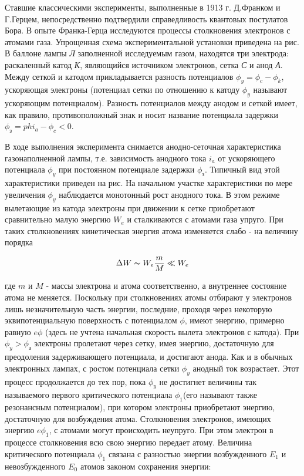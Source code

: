 Ставшие классическими эксперименты, выполненные в 1913 г. Д.Франком и Г.Герцем, непосредственно подтвердили справедливость квантовых постулатов Бора. В опыте Франка-Герца исследуются процессы столкновения электронов с атомами газа. Упрощенная схема экспериментальной установки приведена на рис. В баллоне лампы \textit{Л} заполненной исследуемым газом, находятся три электрода: раскаленный катод \textit{К}, являющийся источником электронов, сетка \textit{С} и анод \textit{А}. Между сеткой и катодом прикладывается разность потенциалов $\phi_y=\phi_c-\phi_k$, ускоряющая
электроны (потенциал сетки по отношению к катоду $\phi_y$ называют ускоряющим потенциалом). Разность потенциалов между анодом и сеткой имеет, как правило, противоположный знак и носит название потенциала задержки $\phi_\text{з}=phi_a-\phi_c<0$.

В ходе выполнения эксперимента снимается анодно-сеточная характеристика газонаполненной лампы, т.е. зависимость анодного тока $i_a$ от ускоряющего потенциала $\phi_y$ при постоянном потенциале задержки $\phi_\text{з}$. Типичный вид этой характеристики приведен на рис. На начальном участке характеристики по мере увеличения $\phi_y$ наблюдается монотонный рост анодного тока. В этом режиме вылетающие из катода электроны при движении к сетке приобретают сравнительно малую энергию $W_e$ и сталкиваются с атомами газа упруго. При таких столкновениях кинетическая энергия атома изменяется слабо - на величину порядка

\begin{equation*}
	\Delta W \thicksim W_e \frac{m}{M} \ll W_e
\end{equation*}

где $m$ и $M$ - массы электрона и атома соответственно, а внутреннее состояние атома не меняется. Поскольку при столкновениях атомы отбирают у электронов лишь незначительную часть энергии, последние, проходя через некоторую эквипотенциальную поверхность с потенциалом $\phi$, имеют энергию, примерно равную $e\phi$ (здесь не учтена начальная скорость вылета электронов с катода).
При $\phi_y>\phi_\text{з}$ электроны пролетают через сетку, имея
энергию, достаточную для преодоления задерживающего потенциала, и достигают анода. Как и в обычных электронных лампах, с ростом потенциала сетки $\phi_y$ анодный ток возрастает. Этот процесс продолжается до тех пор, пока $\phi_y$ не достигнет величины так называемого первого критического потенциала $\phi_1$(его называют также резонансным потенциалом), при котором электроны приобретают энергию, достаточную для возбуждения атома. Столкновения электронов, имеющих энергию $e\phi_1$, с атомами могут происходить неупруго. При этом электрон в процессе столкновения всю свою энергию передает атому. Величина критического потенциала $\phi_1$ связана с разностью энергии возбужденного $E_1$ и невозбужденного $E_0$ атомов законом сохранения энергии:

